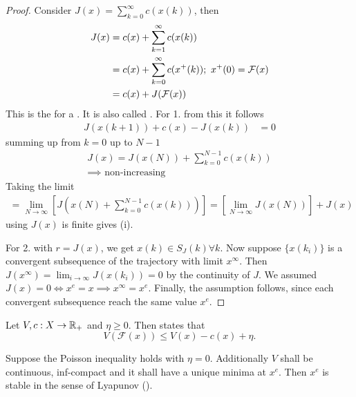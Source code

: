 \begin{proof}
    Consider \(J(x)=\sum_{k=0}^\infty c(x(k))\), then 
    \begin{align*}
        J(x) &= c(x)+\sum_{k=1}^\infty c(x(k))\\
        &=c(x)+\sum_{k=0}^\infty c(x^+(k)); \ x^+(0)=\mathcal{F}(x)\\
        &=c(x)+ J(\mathcal{F}(x))
    \end{align*}
    This is the  for a .
    It is also called .
    For 1. from this it follows \begin{align*}
        J(x(k+1))+c(x)-J(x(k)) &= 0
    \end{align*}
    summing up from \(k=0\) up to \(N-1\)
    \begin{align*}
        J(x)=J(x(N))+\sum_{k=0}^{N-1}c(x(k))\\ \implies \text{ non-increasing}
    \end{align*}
    Taking the limit
    \begin{align*}
        =\lim_{N\to\infty}\left[J(x(N)+\sum_{k=0}^{N-1}c(x(k)))\right]=\left[\lim_{N\to\infty} J(x(N))\right]+J(x)
    \end{align*}
    using \(J(x)\) is finite gives (i).

    For 2. with \(r=J(x)\), we get \(x(k)\in S_J(k)\forall k\). Now suppose \(\{x(k_i)\}\) is a convergent subsequence
    of the trajectory with limit \(x^\infty\). Then \(J(x^\infty)=\lim_{i\to\infty}J(x(k_i))=0\) by the continuity of \(J\).
    We assumed \(J(x)=0 \iff x^e=x\implies x^\infty=x^e.\) Finally, the assumption follows, since each convergent subsequence reach the same value \(x^e\).

\end{proof}

\begin{definition}\label{def:1.9}
    Let \(V,c:X\to\mathbb{R}_+\) and \(\eta\geq 0\). Then  states that 
    \[V(\mathcal{F}(x))\leq V(x)-c(x)+\eta.\]
\end{definition}


\begin{proposition}\label{prop:1.10}
    Suppose the Poisson inequality holds with \(\eta=0\). Additionally
    \(V\) shall be continuous, inf-compact and it shall have a unique minima at $x^e$. Then \(x^e\)
    is stable in the sense of Lyapunov ().    
\end{proposition}

